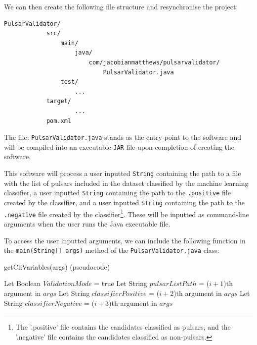 \documentclass{article}
\begin{document}
\begin{appendices}
\begin{subappendices}
        We can then create the following file structure and resynchronise the project:
        
        \begin{lstlisting}[numbers=none]
        PulsarValidator/
            src/
                main/
                    java/
                        com/jacobianmatthews/pulsarvalidator/
                            PulsarValidator.java
                test/
                    ...
            target/
                    ...
            pom.xml
        \end{lstlisting}
        
        The file: \verb|PulsarValidator.java| stands as the entry-point to the software and will be compiled into an executable \verb|JAR| file upon completion of creating the software.
        
        This software will process a user inputted \verb|String| containing the path to a file with the list of pulsars included in the dataset classified by the machine learning classifier, a user inputted \verb|String| containing the path to the \verb|.positive| file created by the classifier, and a user inputted \verb|String| containing the path to the \verb|.negative| file created by the classifier\footnote{The '.positive' file contains the candidates classified as pulsars, and the '.negative' file contains the candidates classified as non-pulsars.}. These will be inputted as command-line arguments when the user runs the Java executable file.
        
        To access the user inputted arguments, we can include the following function in the \verb|main(String[] args)| method of the \verb|PulsarValidator.java| class:
        
        \begin{algorithm}[H]
            \caption{getCliVariables(args) (pseudocode)}
            \begin{algorithmic}
                        \State Let Boolean $ValidationMode$ = true
                        \State Let String $pulsarListPath$ = ($i+1$)th argument in $args$
                        \State Let String $classifierPositive$ = ($i+2$)th argument in $args$
                        \State Let String $classifierNegative$ = ($i+3$)th argument in $args$
                    \EndIf
                \EndFor
            \end{algorithmic}
        \end{algorithm}
        

\end{subappendices}
\end{appendices}
\end{document}
